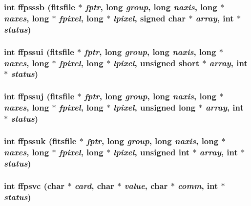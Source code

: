 \subsubsection{\setlength{\rightskip}{0pt plus 5cm}int ffpsssb (\bf{fitsfile} $\ast$ {\em fptr}, long {\em group}, long {\em naxis}, long $\ast$ {\em naxes}, long $\ast$ {\em fpixel}, long $\ast$ {\em lpixel}, signed char $\ast$ {\em array}, int $\ast$ {\em status})}\label{fitsio__64_8h_169a2bd7cc6b4306fac13a357df4dcf0}


\subsubsection{\setlength{\rightskip}{0pt plus 5cm}int ffpssui (\bf{fitsfile} $\ast$ {\em fptr}, long {\em group}, long {\em naxis}, long $\ast$ {\em naxes}, long $\ast$ {\em fpixel}, long $\ast$ {\em lpixel}, unsigned short $\ast$ {\em array}, int $\ast$ {\em status})}\label{fitsio__64_8h_f72bb4b9e6bf54650b3442d4fe08e50a}


\subsubsection{\setlength{\rightskip}{0pt plus 5cm}int ffpssuj (\bf{fitsfile} $\ast$ {\em fptr}, long {\em group}, long {\em naxis}, long $\ast$ {\em naxes}, long $\ast$ {\em fpixel}, long $\ast$ {\em lpixel}, unsigned long $\ast$ {\em array}, int $\ast$ {\em status})}\label{fitsio__64_8h_59750e86feb6356e01a6ce684dad31d1}


\subsubsection{\setlength{\rightskip}{0pt plus 5cm}int ffpssuk (\bf{fitsfile} $\ast$ {\em fptr}, long {\em group}, long {\em naxis}, long $\ast$ {\em naxes}, long $\ast$ {\em fpixel}, long $\ast$ {\em lpixel}, unsigned int $\ast$ {\em array}, int $\ast$ {\em status})}\label{fitsio__64_8h_6211df3aa144d88cda8fd8fe8eade594}


\subsubsection{\setlength{\rightskip}{0pt plus 5cm}int ffpsvc (char $\ast$ {\em card}, char $\ast$ {\em value}, char $\ast$ {\em comm}, int $\ast$ {\em status})}\label{fitsio__64_8h_9a1a8933359feb3576cc14a1e5c671c5}


